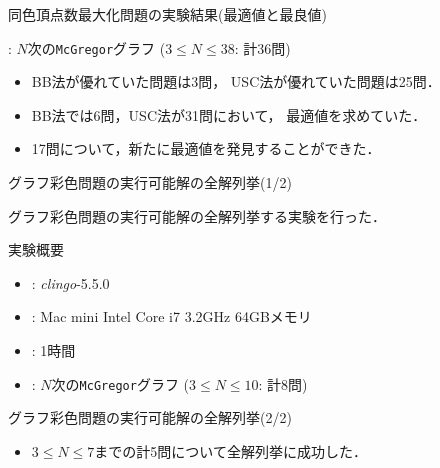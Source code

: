 \documentclass[dvipdfmx,11pt]{beamer}
\newcommand{\code}[1]{\lstinline[basicstyle=\ttfamily]{#1}}
\begin{document}
\begin{frame}{同色頂点数最大化問題の実験結果(最適値と最良値)}
 \begin{block}{}
  : $N$次の\code{McGregor}グラフ ($3 \leq N\leq 38$: 計36問)
 \end{block}
 
 \begin{center}
  
 \end{center}

 \begin{itemize}
  \item BB法が優れていた問題は3問，
        USC法が優れていた問題は25問．
  \item BB法では6問，USC法が31問において，
	最適値を求めていた．
  \item 17問について，新たに最適値を発見することができた．
 \end{itemize}
\end{frame}
\begin{frame}[noframenumbering]{グラフ彩色問題の実行可能解の全解列挙(1/2)}
 \thispagestyle{empty}

 \begin{block}{}
  グラフ彩色問題の実行可能解の全解列挙する実験を行った．  
 \end{block}

 \begin{block}{実験概要}
  \begin{itemize}
   \item {}: \textit{clingo}-5.5.0
   \item {}: Mac mini Intel Core i7 3.2GHz 64GBメモリ
   \item {}: 1時間
   \item {}: $N$次の\code{McGregor}グラフ ($3 \leq N\leq 10$: 計8問)
  \end{itemize}
 \end{block}
\end{frame}

\begin{frame}[noframenumbering]{グラフ彩色問題の実行可能解の全解列挙(2/2)}
 \thispagestyle{empty}

 \begin{center}
  
 \end{center}

 \begin{itemize}
  \item $3 \leq N\leq 7$までの計5問について全解列挙に成功した．
 \end{itemize}
\end{frame}

\end{document}
